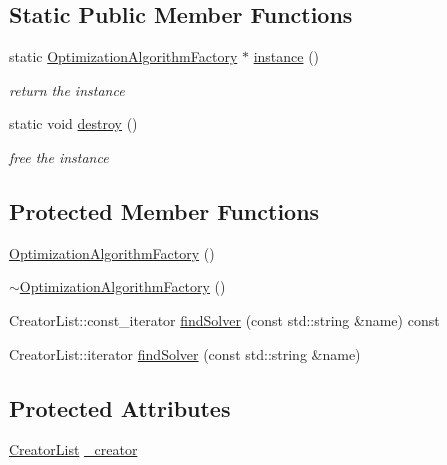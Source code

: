 \subsection*{Static Public Member Functions}
\begin{DoxyCompactItemize}
\item 
static \hyperlink{classg2o_1_1OptimizationAlgorithmFactory}{Optimization\+Algorithm\+Factory} $\ast$ \hyperlink{classg2o_1_1OptimizationAlgorithmFactory_a4fe827a82f01c74ef124e7a9a9c98707}{instance} ()
\begin{DoxyCompactList}\small\item\em return the instance \end{DoxyCompactList}\item 
static void \hyperlink{classg2o_1_1OptimizationAlgorithmFactory_a80b6a74ac262e6192064ec264f965bd7}{destroy} ()
\begin{DoxyCompactList}\small\item\em free the instance \end{DoxyCompactList}\end{DoxyCompactItemize}
\subsection*{Protected Member Functions}
\begin{DoxyCompactItemize}
\item 
\hyperlink{classg2o_1_1OptimizationAlgorithmFactory_ac0e56515170544768e4cad9f2fede55c}{Optimization\+Algorithm\+Factory} ()
\item 
\hyperlink{classg2o_1_1OptimizationAlgorithmFactory_a172879a5ecbbe9ec7c4771c87aef1c57}{$\sim$\+Optimization\+Algorithm\+Factory} ()
\item 
Creator\+List\+::const\+\_\+iterator \hyperlink{classg2o_1_1OptimizationAlgorithmFactory_a8e37aaa37f66f7f5e3bdd8a3c8bf58c6}{find\+Solver} (const std\+::string \&name) const 
\item 
Creator\+List\+::iterator \hyperlink{classg2o_1_1OptimizationAlgorithmFactory_a75857fd4977318d51412f4ebae20157d}{find\+Solver} (const std\+::string \&name)
\end{DoxyCompactItemize}
\subsection*{Protected Attributes}
\begin{DoxyCompactItemize}
\item 
\hyperlink{classg2o_1_1OptimizationAlgorithmFactory_a3ed210b94bf09b47e30d07da3766b4ec}{Creator\+List} \hyperlink{classg2o_1_1OptimizationAlgorithmFactory_a1d7f67d60df0d0b26a7694dcea4879db}{\+\_\+creator}
\end{DoxyCompactItemize}
